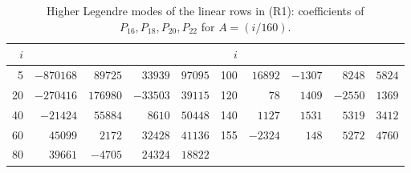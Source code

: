 \documentclass[11pt,colorlinks]{charlie}
\begin{document}
\begin{table}[ht]\centering\small
\caption{Higher Legendre modes of the linear rows in (R1): coefficients of $P_{16},P_{18},P_{20},P_{22}$ for $A=(i/160)$.}\label{tab:added}
\setlength{\tabcolsep}{4.5pt}\begin{tabular}{@{}rrrrr@{\quad}rrrrr@{}}
\toprule
$i$&&&&&$i$&&&&\\\midrule
5&$-870168$&$89725$&$33939$&$97095$&100&$16892$&$-1307$&$8248$&$5824$\\
20&$-270416$&$176980$&$-33503$&$39115$&120&$78$&$1409$&$-2550$&$1369$\\
40&$-21424$&$55884$&$8610$&$50448$&140&$1127$&$1531$&$5319$&$3412$\\
60&$45099$&$2172$&$32428$&$41136$&155&$-2324$&$148$&$5272$&$4760$\\
80&$39661$&$-4705$&$24324$&$18822$&&&&&\\
\bottomrule
\end{tabular}
\end{table}
\end{document}
